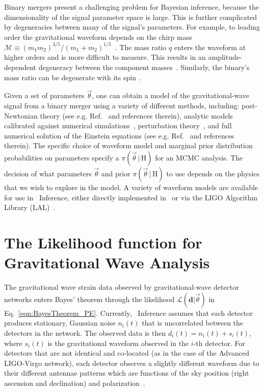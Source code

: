 Binary mergers present a challenging problem for Bayesian inference, because the
dimensionality of the signal parameter space is large. This is further
complicated by degeneracies between many of the signal's parameters. For example, to
leading order the gravitational waveform depends on the chirp mass
$\mathcal{M} \equiv (m_1 m_2)^{3/5} / (m_1 + m_2)^{1/5}$~\cite{Peters:1963ux}.
The mass ratio $q$ enters the waveform at
higher orders and is more difficult to measure. This results in an
amplitude-dependent degeneracy between the component
masses~\cite{Christensen:2001cr}. Similarly, the binary's mass ratio can be
degenerate with its spin~\cite{Hannam:2013uu}.

Given a set of parameters $\vec{\theta}$, one can obtain a model of the
gravitational-wave signal from a binary merger using a variety of different
methods, including: post-Newtonian theory (see e.g. Ref.~\cite{Blanchet2006}
and references therein), analytic models calibrated against numerical
simulations~\cite{Buonanno:1998gg,Buonanno:2000ef,Damour:2000we,Damour:2001tu,Ajith:2007qp,Ajith:2009bn,Santamaria:2010yb},
perturbation theory~\cite{Teukolsky:1972my,Berti:2009kk}, and full numerical
solution of the Einstein equations (see e.g. Ref.~\cite{Cardoso:2014uka} and
references therein). The specific choice of waveform model and marginal prior distribution probabilities
on parameters specify a $\pi(\vec{\theta} \, | \, \mathrm{H})$ for an MCMC analysis.
The decision of what parameters $\vec{\theta}$ and prior $\pi(\vec{\theta} \, | \, \mathrm{H})$ 
to use depends on the
physics that we wish to explore in the model. A variety of waveform models are available
for use in \pycbc{}\ Inference, either directly implemented in \pycbc{}\ or via 
the LIGO Algorithm Library (LAL)~\cite{lal}.

\section{The Likelihood function for Gravitational Wave Analysis}
The gravitational wave strain data observed by gravitational-wave detector networks
enters Bayes' theorem through the likelihood $\mathcal{L}(\mathbf{d} | \vec{\theta})$
 in Eq.~\ref{eqn:BayesTheorem_PE}.
Currently, \pycbc{}\ Inference assumes that each detector produces stationary,
Gaussian noise $n_{i}(t)$ that is uncorrelated between the detectors in the
network. The observed data is then $d_{i}(t) = n_{i}(t) + s_{i}(t)$, where
$s_i(t)$ is the gravitational waveform observed in the $i$-th detector.  For
detectors that are not identical and co-located (as in the case of the Advanced LIGO-Virgo network), each detector observes a slightly different waveform due to their different antennae patterns which are functions of the sky position (right ascension and declination) and polarization~\cite{Wahlquist:1987rx}.

